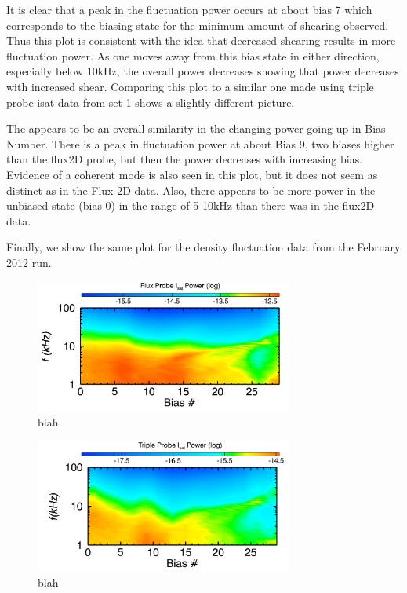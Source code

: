 \documentclass[aip,pop,amsmath,amssymb,preprint,superscriptaddress]{revtex4-1} %
\begin{document}
It is clear that a peak in the fluctuation power occurs at about bias 7 which corresponds to the biasing state for the minimum amount of shearing observed. Thus this plot is consistent with the idea that decreased shearing results in more fluctuation power. As one moves away from this bias state in either direction, especially below 10kHz, the overall power decreases showing that power decreases with increased shear.  Comparing this plot to a similar one made using triple probe isat data from set 1 shows a slightly different picture.

The appears to be an overall similarity in the changing power going up in Bias Number. There is a peak in fluctuation power at about Bias 9, two biases higher than the flux2D probe,  but then the power decreases with increasing bias. Evidence of a coherent mode is also seen in this plot, but it does not seem as distinct as in the Flux 2D data.  Also, there appears to be more power in the unbiased state (bias 0) in the range of 5-10kHz than there was in the flux2D data.

Finally, we show the same plot for the density fluctuation data from the February 2012 run. 

\begin{figure}[!htbp]
\centerline{
\includegraphics[width=8.5cm]{flux_flucs}}
\caption{\label{fig:flux_flucs} blah}
\end{figure}

\begin{figure}[!htbp]
\centerline{
\includegraphics[width=8.5cm]{trip_flucs}}
\caption{\label{fig:trip_flucs} blah}
\end{figure}
\end{document}
